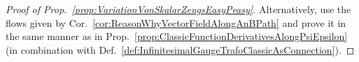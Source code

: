 \begin{proof}[Proof of Prop.~\ref{prop:VariationVonSkalarZeugsEasyPeasy}]
Alternatively, use the flows given by Cor.~\ref{cor:ReasonWhyVectorFieldAlongAnBPath} and prove it in the same manner as in Prop.~\ref{prop:ClassicFunctionDerivativesAlongPsiEpsilon} (in combination with Def.~\ref{def:InfinitesimalGaugeTrafoClassicAsConnection}).

\end{proof}
